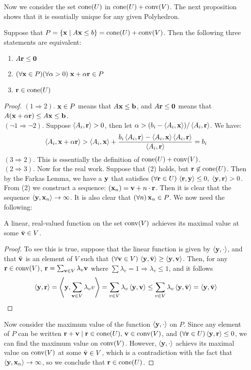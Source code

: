 Now we consider the set $\cone(U)$ in $\cone(U) + \conv(V)$.  The next proposition shows that it is essntially unique for any given Polyhedron.

\begin{Prop}\label{characteristic_cone}
	Suppose that $P = \HP{A}{b} = \VP{U}{V}$.  Then the following three statements are equivalent:
	\begin{enumerate}
		\item $A\r\leq\0$
		\item $(\forall \x\in P)(\forall \alpha > 0)\;\x + \alpha\r \in P$
		\item $\r \in \cone(U)$
	\end{enumerate}
\end{Prop}

\begin{proof}
	$(1 \Rightarrow 2)$. $\x\in P$ means that $A\x\leq\b$, and $A\r\leq\0$ means that $A(\x+\alpha\r) \leq A\x \leq \b$.\\
	$(\neg 1 \Rightarrow \neg 2)$.  Suppose $\ip{A_i}{\r} > 0$, then let $\alpha > (b_i - \ip{A_i}{\x})/\ip{A_i}{\r}$.  We have:
	\[ \ip{A_i}{\x + \alpha\r} > \ip{A_i}{\x} +
		\frac{b_i\ip{A_i}{\r} - \ip{A_i}{\x}\ip{A_i}{\r}}{\ip{A_i}{\r}} = b_i \]
	$(3 \Rightarrow 2)$.  This is essentially the definition of $\VP{U}{V}$.\\
	$(2 \Rightarrow 3)$.  Now for the real work.  Suppose that (2) holds, but $\r\not\in\cone(U)$.  Then by the Farkas Lemma, we have a $\y$ that satisfies $(\forall \r\in U)\,\ip{\r}{\y}\leq 0,\; \ip{\y}{\r} > 0$.  From (2) we construct a sequence: $(\x_n) = \v+n\cdot\r$.  Then it is clear that the sequence $\ip{\y}{\x_n} \to \infty$.  It is also clear that $(\forall n)\,\x_n \in P$.  We now need the following:
	\begin{Prop}\label{max_linear_func}
		A linear, real-valued function on the set $\conv(V)$ achieves its maximal value at some $\bar\v \in V$.
	\end{Prop}
	\begin{proof}
		To see this is true, suppose that the linear function is given by $\ip{\y}{\cdot}$, and that $\bar\v$ is an element of $V$ such that $(\forall \v \in V)\,\ip{\y}{\bar\v} \geq \ip{\y}{\v}$.  Then, for any $\r \in \conv(V)$, $\r = \sum_{\v\in V} \lambda_v\v$ where $\sum \lambda_v = 1 \Rightarrow \lambda_v \leq 1$, and it follows
		\[\ip{\y}{\r} = \ip{\y}{\sum_{\v\in V}\lambda_v v} = \sum_{v\in V} \lambda_v\ip{\y}{\v}
			\leq \sum_{v\in V}\lambda_v\ip{\y}{\bar\v} = \ip{\y}{\bar\v} \]
	\end{proof}
	Now consider the maximum value of the function $\ip{\y}{\cdot}$ on $P$.  Since any element of $P$ can be written $\r + \v \st \r\in\cone(U),\,\v\in\conv(V)$, and $(\forall\r\in U) \ip{\y}{\r} \leq 0$, we can find the maximum value on $\conv(V)$.  However, $\ip{\y}{\cdot}$ achievs its maximal value on $\conv(V)$ at some $\bar\v\in V$, which is a contradiction with the fact that $\ip{\y}{\x_n} \to \infty$, so we conclude that $\r\in\cone(U)$.
\end{proof}

